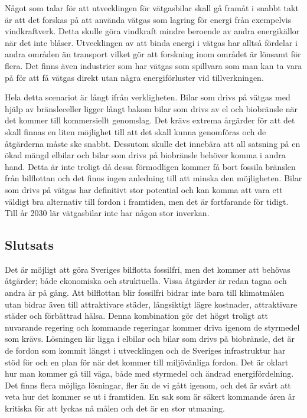 \documentclass[a4paper,11pt,fleqn, titlepage]{article}
\begin{document}
Något som talar för att utvecklingen för vätgasbilar skall gå framåt i snabbt takt är att det forskas på att använda vätgas som lagring för energi från exempelvis vindkraftverk. Detta skulle göra vindkraft mindre beroende av andra energikällor när det inte blåser. Utvecklingen av att binda energi i vätgas har alltså fördelar i andra områden än transport vilket gör att forskning inom området är lönsamt för flera. Det finns även industrier som har vätgas som spillvara som man kan ta vara på för att få vätgas direkt utan några energiförluster vid tillverkningen.

Hela detta scenariot är långt ifrån verkligheten. Bilar som drivs på vätgas med hjälp av bränsleceller ligger långt bakom bilar som drivs av el och biobränsle när det kommer till kommersiellt genomslag. Det krävs extrema årgärder för att det skall finnas en liten möjlighet till att det skall kunna genomföras och de åtgärderna måste ske snabbt. Dessutom skulle det innebära att all satsning på en ökad mängd elbilar och bilar som drivs på biobränsle behöver komma i andra hand. Detta är inte troligt då dessa förmodligen kommer få bort fossila bränslen från bilflottan och det finns ingen anledning till att minska den möjligheten. Bilar som drivs på vätgas har definitivt stor potential och kan komma att vara ett väldigt bra alternativ till fordon i framtiden, men det är fortfarande för tidigt. Till år 2030 lär vätgasbilar inte har någon stor inverkan.

\subsection{Slutsats}
Det är möjligt att göra Sveriges bilflotta fossilfri, men det kommer att behövas åtgärder; både ekonomiska och struktuella. Vissa åtgärder är redan tagna och andra är på gång. Att bilflottan blir fossilfri bidrar inte bara till klimatmålen utan bidrar även till attraktivare städer, långsiktigt lägre kostnader, attraktivare städer och förbättrad hälsa. Denna kombination gör det högst troligt att nuvarande regering och kommande regeringar kommer driva igenom de styrmedel som krävs. Lösningen lär ligga i elbilar och bilar som drivs på biobränsle, det är de fordon som kommit längst i utvecklingen och de Sveriges infrastruktur har stöd för och en plan för när det kommer till miljövänliga fordon. Det är oklart hur man kommer gå till väga, både med styrmedel och ändrad energifördelning. Det finns flera möjliga lösningar, fler än de vi gått igenom, och det är svårt att veta hur det kommer se ut i framtiden. En sak som är säkert kommande åren är kritiska för att lyckas nå målen och det är en stor utmaning.
\printbibliography
\end{document}
